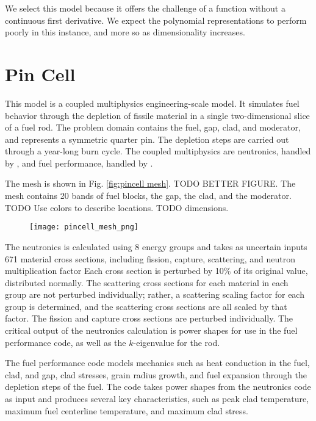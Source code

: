 We select this model because it offers the challenge of a function
without a continuous first derivative.  We expect the polynomial representations to perform poorly
in this instance, and more so as dimensionality increases.
\section{Pin Cell}\label{mod:pincell}
This model is a coupled multiphysics engineering-scale model.  It simulates fuel behavior through the depletion of fissile material
in a single two-dimensional slice of a fuel rod.  The problem domain contains the fuel, gap, clad, and
moderator, and represents a symmetric quarter pin.  The depletion steps are carried out through a year-long
burn cycle.
The coupled multiphysics are neutronics, handled by \rattlesnake{}, and fuel performance, handled by
\bison{}.  

The mesh is shown in Fig. \ref{fig:pincell mesh}.  TODO BETTER FIGURE.  The mesh contains 20 bands of fuel
blocks, the gap, the clad, and the moderator.  TODO Use colors to describe locations.  TODO dimensions.
\begin{figure}[htb]
  \centering
  \texttt{[image: pincell\_mesh\_png]}
\end{figure}

The neutronics is calculated using 8 energy groups and takes as uncertain inputs 671 material cross
sections, including fission, capture, scattering, and neutron multiplication factor  Each cross section is
perturbed by 10\% of its original value, distributed normally.  The scattering cross
sections for each material in each group are not perturbed individually; rather, a scattering scaling factor
for each group is determined, and the scattering cross sections are all scaled by that factor.  The fission
and capture cross sections are perturbed individually.  The critical output of the neutronics calculation is
power shapes for use in the fuel performance code, as well as the $k$-eigenvalue for the rod.

The fuel performance code models mechanics such as heat conduction in the fuel, clad, and gap, clad stresses, grain radius
growth, and fuel expansion through the depletion steps of the fuel. The code takes power shapes
from the neutronics code as input and produces several key characteristics, such as peak clad temperature, maximum
fuel centerline temperature, and maximum clad stress.

